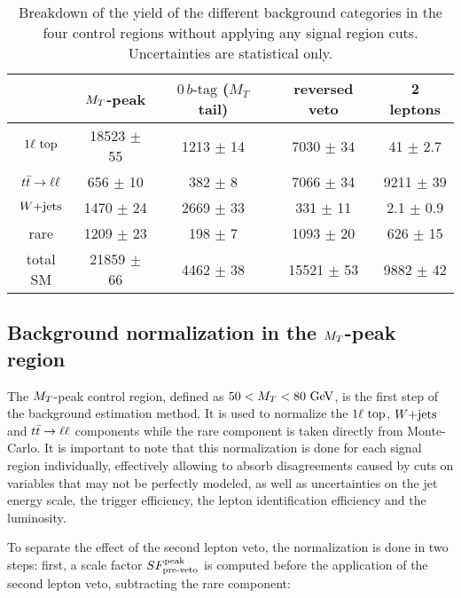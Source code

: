 \begin{table}[h!]
    \centering
\begin{tabular}{|c|cccc|}
    \hline
                     & $M_T$-peak       & $0\, b\text{-tag}$ ($M_T$ tail) & reversed veto    & 2 leptons             \\
    \hline
     $1\ell~\text{top}$ & 18523 $\pm$ 55   &  1213 $\pm$ 14        &  7030 $\pm$ 34   &   41 $\pm$ 2.7  \\
     $t\bar{t} \rightarrow \ell \ell$  &   656 $\pm$ 10   &   382 $\pm$ 8         &  7066 $\pm$ 34   & 9211 $\pm$ 39   \\
     $\text{$W$+jets}$        &  1470 $\pm$ 24   &  2669 $\pm$ 33        &   331 $\pm$ 11   &  2.1 $\pm$ 0.9  \\
     rare            &  1209 $\pm$ 23   &   198 $\pm$ 7         &  1093 $\pm$ 20   &  626 $\pm$ 15   \\
    \hline
     total SM        & 21859 $\pm$ 66   &  4462 $\pm$ 38        & 15521 $\pm$ 53   & 9882 $\pm$ 42   \\
    \hline
\end{tabular}
    \caption{Breakdown of the yield of the different background categories in
    the four control regions without applying any signal region cuts.
    Uncertainties are statistical only.} \label{tab:cutflowControlRegions}
\end{table}

        \subsection{Background normalization in the $M_T$-peak region \label{sec:MTpeakNormalization}}

    The $M_T$-peak control region, defined as $50 < M_T < 80 ~\text{GeV}$, is the first
    step of the background estimation method. It is used to normalize the
    $1\ell~\text{top}$, $\text{$W$+jets}$ and $t\bar{t} \rightarrow \ell \ell$ components while the rare
    component is taken directly from Monte-Carlo.  It is important to note that
    this normalization is done for each signal region individually, effectively
    allowing to absorb disagreements caused by cuts on variables that may not be
    perfectly modeled, as well as uncertainties on the jet energy scale, the
    trigger efficiency, the lepton identification efficiency and the luminosity.

    To separate the effect of the second lepton veto, the  normalization is done
    in two steps: first, a scale factor $SF_{\text{pre-veto}}^{\text{peak}}$ is computed before the
    application of the second lepton veto, subtracting the rare component:

